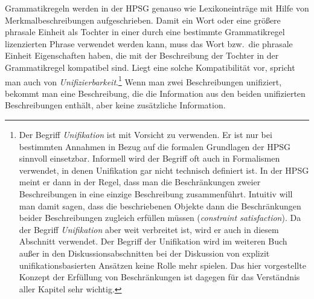 \mbox{}%
Grammatikregeln werden in der HPSG genauso wie Lexikoneinträge mit Hilfe von Merkmalbeschreibungen
aufgeschrieben. %
Damit ein Wort oder eine größere phrasale Einheit als Tochter in einer durch eine bestimmte Grammatikregel lizenzierten Phrase
verwendet werden kann, muss das Wort bzw.\ die phrasale Einheit Eigenschaften haben, die mit
der Beschreibung der Tochter in der Grammatikregel kompatibel sind. Liegt eine solche Kompatibilität vor, spricht
man auch von \emph{Unifizierbarkeit}.\footnote{
  Der Begriff \emph{Unifikation} ist mit Vorsicht zu verwenden. Er ist nur bei bestimmten Annahmen
  in Bezug auf die formalen Grundlagen der HPSG sinnvoll einsetzbar. Informell wird der Begriff oft
  auch in Formalismen verwendet, in denen Unifikation gar nicht technisch definiert ist. In der HPSG
  meint er dann in der Regel, dass man die Beschränkungen zweier Beschreibungen in eine einzige
  Beschreibung zusammenführt. Intuitiv will man damit sagen, dass die beschriebenen Objekte dann die
  Beschränkungen beider Beschreibungen zugleich erfüllen müssen (\emph{constraint satisfaction}). Da
  der Begriff \emph{Unifikation} aber weit verbreitet ist, wird er auch in diesem Abschnitt verwendet. Der Begriff der
  Unifikation wird im weiteren Buch außer in den Diskussionsabschnitten bei der Diskussion von explizit unifikationsbasierten
  Ansätzen keine Rolle mehr spielen. Das hier vorgestellte Konzept der
  Erfüllung von Beschränkungen ist dagegen für das Verständnis aller Kapitel sehr wichtig.%
}
Wenn man zwei Beschreibungen unifiziert, bekommt man
eine Beschreibung, die die Information aus den beiden unifizierten Beschreibungen enthält, aber
keine zusätzliche Information.

